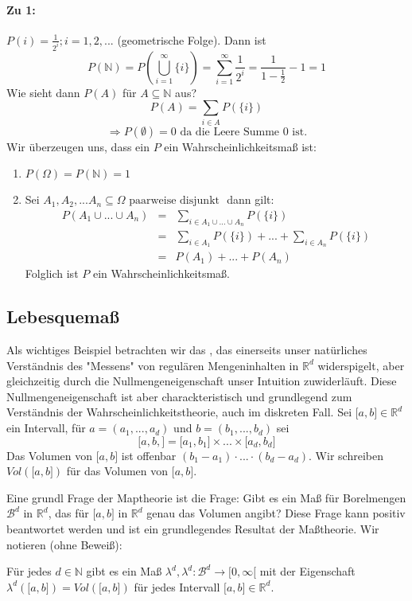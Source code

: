 \paragraph*{Zu 1:}
$P({i}) = \frac{1}{2^i}; i = 1,2,... $ (geometrische Folge). Dann ist
$$P(\mathbb N) = P \left ( \bigcup_{i=1}^\infty \{i\} \right ) = \sum_{i=1}^\infty \frac{1}{2^i} %
= \frac{1}{1-\frac{1}{2}} - 1 = 1$$ 
Wie sieht dann $P(A)$ für $A \subseteq \mathbb N$ aus?
$$P(A) = \sum_{i \in A} P(\{i\})$$
$$ \Rightarrow P(\emptyset) = 0 \textrm{ da die Leere Summe 0 ist.}$$
Wir überzeugen uns, dass ein $P$ ein Wahrscheinlichkeitsmaß ist:
\begin{enumerate}
 \item $ P(\Omega) = P(\mathbb N) = 1 $
 \item Sei $ A_1, A_2, ... A_n \subseteq \Omega \textrm{ paarweise disjunkt } $ dann gilt:
\begin{eqnarray*}
 P(A_1 \cup ... \cup A_n) & = & \sum_{i \in A_1 \cup ... \cup A_n} P(\{i\}) \\
 & = & \sum_{i \in A_1} P(\{i\}) + ... + \sum_{i \in A_n} P(\{i\}) \\
 & = & P(A_1) + ... + P(A_n) \nonumber
\end{eqnarray*}
Folglich ist $P$ ein Wahrscheinlichkeitsmaß.
\end{enumerate}

\subsection{Lebesquemaß}
Als wichtiges Beispiel betrachten wir das , das einerseits unser natürliches Verständnis des "Messens" von %
regulären Mengeninhalten in $\mathbb R^d$ widerspigelt, aber gleichzeitig durch die Nullmengeneigenschaft unser Intuition %
zuwiderläuft. Diese Nullmengeneigenschaft ist aber charackteristisch und grundlegend zum Verständnis der Wahrscheinlichkeitstheorie, %
auch im diskreten Fall.
Sei $\lbrack a,b \rbrack \in \mathbb R^d$ ein Intervall, für $a=(a_1, ... , a_d )$ und $b=(b_1, ... , b_d)$ sei
$$ \lbrack a,b, \rbrack = \lbrack a_1,b_1 \rbrack \times ... \times \lbrack a_d,b_d \rbrack $$
Das Volumen von $\lbrack a,b \rbrack$ ist offenbar $(b_1 - a_1) \cdot ... \cdot (b_d - a_d)$. Wir schreiben $Vol(\lbrack a,b \rbrack)$ %
für das Volumen von $\lbrack a,b \rbrack$.

Eine grundl Frage der Maptheorie ist die Frage:
Gibt es ein Maß für Borelmengen $\mathcal B^d$ in $\mathbb R^d$, das für $\lbrack a,b \rbrack$ in $\mathbb R^d$ genau das Volumen angibt? %
Diese Frage kann positiv beantwortet werden und ist ein grundlegendes Resultat der Maßtheorie. Wir notieren (ohne Beweiß):
\begin{theorem}
Für jedes $d\in \mathbb N $ gibt es ein Maß $\lambda^d, \lambda^d: \mathcal B^d \rightarrow \lbrack 0,\infty \lbrack$ %
mit der Eigenschaft $\lambda^d(\lbrack a,b\rbrack) = Vol(\lbrack a,b \rbrack)$ für jedes Intervall $\lbrack a,b \rbrack \in \mathbb R^d$.
\end{theorem}

